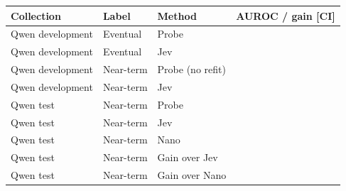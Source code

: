 \begin{tabular}{llll}
\toprule
Collection & Label & Method & AUROC / gain [CI] \\
\midrule
Qwen development & Eventual & Probe & \qwenOriginalEventualProbe{} \qwenOriginalEventualProbeCI{} \\
Qwen development & Eventual & Jev & \qwenOriginalEventualJev{} \qwenOriginalEventualJevCI{} \\
Qwen development & Near-term & Probe (no refit) & \qwenOriginalNeartermProbe{} \qwenOriginalNeartermProbeCI{} \\
Qwen development & Near-term & Jev & \qwenOriginalNeartermJev{} \qwenOriginalNeartermJevCI{} \\
Qwen test & Near-term & Probe & \qwenRoundFreshProbe{} \qwenRoundFreshProbeCI{} \\
Qwen test & Near-term & Jev & \qwenRoundFreshJev{} \qwenRoundFreshJevCI{} \\
Qwen test & Near-term & Nano & \qwenRoundFreshNano{} \qwenRoundFreshNanoCI{} \\
Qwen test & Near-term & Gain over Jev & \qwenRoundFreshGainJev{} \qwenRoundFreshGainJevCI{} \\
Qwen test & Near-term & Gain over Nano & \qwenRoundFreshGainNano{} \qwenRoundFreshGainNanoCI{} \\
\bottomrule
\end{tabular}
